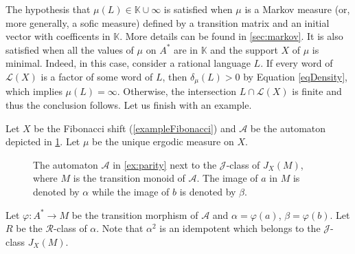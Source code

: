 \documentclass[a4paper,UKenglish,numberwithinsect,cleveref]{lipics-v2021}
\newcommand{\drawgrid}[3]{
            \foreach \i in {2,...,#1}
                \draw (#3-\i-1.north west) to (#3-\i-#1.north east);
            \foreach \i in {2,...,#2}
                \draw (#3-1-\i.north west) to (#3-#2-\i.south west);
            }
\newcommand{\JJ}{\mathrel{\mathscr{J}}}
\newcommand{\RR}{\mathrel{\mathscr{R}}}
\newcommand{\A}{\mathcal A}
\newcommand{\K}{\mathbb{K}}
\newcommand{\cL}{\mathcal L}
\newcommand*{\from}{\colon}
\begin{document}
The hypothesis that $\mu(L)\in \K\cup\infty$ is satisfied when $\mu$ is a Markov measure (or, more generally, a sofic measure) defined by a transition matrix and an initial vector with coefficents in $\K$. 
More details can be found in \cref{sec:markov}. 
It is also satisfied when all the values of $\mu$ on $A^*$ are in $\K$ and the support $X$
of $\mu$ is minimal. Indeed, in this case, consider a rational language $L$. If every word
of $\cL(X)$ is a factor of some word of $L$, then $\delta_\mu(L)>0$ by Equation \eqref{eqDensity},
which implies $\mu(L)=\infty$. Otherwise, the intersection $L\cap \cL(X)$ is
finite and thus the conclusion follows. Let us finish with an example.

\begin{example}\label{ex:parity}
    Let $X$ be the Fibonacci shift (\cref{exampleFibonacci}) and $\A$ be the automaton
    depicted in \cref{figureJClass}. Let $\mu$ be the unique ergodic measure on $X$.
    \begin{figure}
      \centering
        \quad
        \caption{The automaton $\A$ in \cref{ex:parity} next to the $\JJ$-class of $J_X(M)$, where $M$ is the transition monoid of $\A$. The image of $a$ in $M$ is denoted by $\alpha$ while the image of $b$ is denoted by $\beta$.}\label{figureJClass}
    \end{figure}
    Let $\varphi\from A^*\to M$ be the transition morphism of $\A$ and
    $\alpha=\varphi(a)$, $\beta=\varphi(b)$. Let $R$ be the $\RR$-class of $\alpha$. Note that $\alpha^2$ is an idempotent which belongs to the $\JJ$-class $J_X(M)$. 


\end{example}
\end{document}
